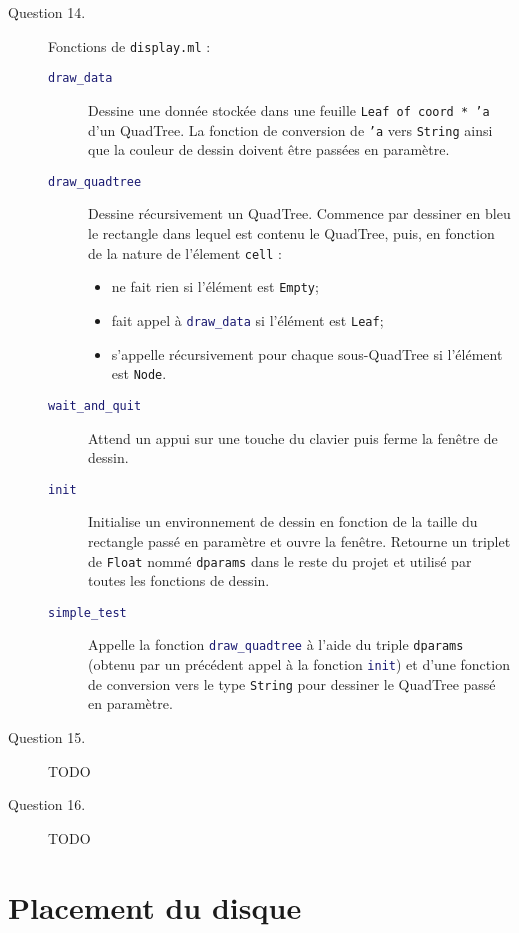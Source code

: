 \documentclass[11pt]{scrartcl}
\newcommand{\functionname}[1]{\texttt{\textcolor{MidnightBlue}{#1}}}
\newcommand{\filename}[1]{\texttt{\textcolor{RawSienna}{#1}}}
\newcommand{\code}[1]{\texttt{#1}}
\begin{document}
\begin{description}
\item[Question 14.] Fonctions de \filename{display.ml} :
\begin{description}
\item[\functionname{draw_data}] Dessine une donnée stockée dans une feuille \code{Leaf of coord * 'a} d'un QuadTree. La fonction de conversion de \code{'a} vers \code{String} ainsi que la couleur de dessin doivent être passées en paramètre.
\item[\functionname{draw_quadtree}] Dessine récursivement un QuadTree. Commence par dessiner en bleu le rectangle dans lequel est contenu le QuadTree, puis, en fonction de la nature de l'élement \code{cell} :
\begin{itemize}
\item ne fait rien si l'élément est \code{Empty};
\item fait appel à \functionname{draw_data} si l'élément est \code{Leaf};
\item s'appelle récursivement pour chaque sous-QuadTree si l'élément est \code{Node}.
\end{itemize}
\item[\functionname{wait_and_quit}] Attend un appui sur une touche du clavier puis ferme la fenêtre de dessin.
\item[\functionname{init}] Initialise un environnement de dessin en fonction de la taille du rectangle passé en paramètre et ouvre la fenêtre. Retourne un triplet de \code{Float} nommé \code{dparams} dans le reste du projet et utilisé par toutes les fonctions de dessin. 
\item[\functionname{simple_test}] Appelle la fonction \functionname{draw_quadtree} à l'aide du triple \code{dparams} (obtenu par un précédent appel à la fonction \functionname{init}) et d'une fonction de conversion vers le type \code{String} pour dessiner le QuadTree passé en paramètre.
\end{description}

\item[Question 15.] TODO

\item[Question 16.] TODO
\end{description}

\section{Placement du disque}
\end{document}
